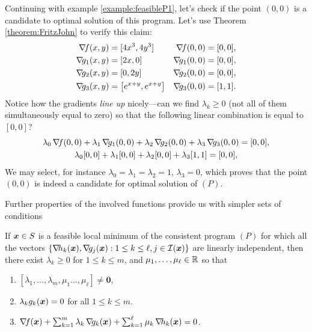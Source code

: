 \begin{example}
Continuing with example \ref{example:feasibleP1}, let's check if the point $(0,0)$ is a candidate to optimal solution of this program.  Let's use Theorem \ref{theorem:FritzJohn} to verify this claim:
\begin{align*}
\gradient{f}(x,y) &= [ 4x^3, 4y^3 ] &\gradient{f}(0,0) &= [0,0], \\
\gradient{g_1}(x,y) &= [ 2x, 0 ] &\gradient{g_1}(0,0) &= [0,0], \\
\gradient{g_2}(x,y) &= [0, 2y] &\gradient{g_2}(0,0) &= [0,0], \\
\gradient{g_3}(x,y) &= \big[e^{x+y}, e^{x+y} \big] &\gradient{g_3}(0,0) &= [1,1].
\end{align*}
Notice how the gradients \emph{line up} nicely---can we find $\lambda_k \geq 0$ (not all of them simultaneously equal to zero) so that the following linear combination is equal to $[0,0]$?
\begin{gather*}
\lambda_0\mathop{\nabla\! {f}}(0,0) + \lambda_1 \mathop{\nabla\! {g_1}}(0,0) + \lambda_2 \mathop{\nabla\! {g_2}}(0,0) + \lambda_3 \mathop{\nabla\! {g_3}}(0,0) = [0,0], \\
\lambda_0[0,0] + \lambda_1[0,0] + \lambda_2[0,0] + \lambda_3[1,1] = [0,0],
\end{gather*}
We may select, for instance $\lambda_0=\lambda_1=\lambda_2=1$, $\lambda_3=0$, which proves that the point $(0,0)$ is indeed a candidate for optimal solution of $(P)$.
\end{example}

\separator
Further properties of the involved functions provide us with simpler sets of conditions

\begin{theorem}\label{theorem:KKTnecessary}
If $\boldsymbol{x} \in S$ is a feasible local minimum of the consistent program $(P)$ for which all the vectors $\{ \mathop{\nabla\! {h_k}}(\boldsymbol{x}), \mathop{\nabla\! {g_j}}(\boldsymbol{x}) : 1 \leq k \leq \ell, j \in \mathcal{I}(\boldsymbol{x}) \}$ are linearly independent, then there exist $\lambda_k \geq 0$ for $1\leq k \leq m$, and $\mu_1, \dots, \mu_\ell \in \mathbb{R}$ so that
\begin{enumerate}
 	\item\label{item:KKTnecessary1} $[\lambda_1, \dotsc, \lambda_m, \mu_1 \dotsc, \mu_\ell ] \neq \boldsymbol{0}$,
 	\item\label{item:KKTnecessary2} $\lambda_k g_k(\boldsymbol{x}) = 0$ for all $1 \leq k \leq m$.
 	\item\label{item:KKTnecessary3} $\mathop{\nabla\! {f}}(\boldsymbol{x}) + \sum_{k=1}^m \lambda_k \mathop{\nabla\! {g_k}}(\boldsymbol{x}) + \sum_{k=1}^\ell \mu_k \mathop{\nabla\! {h_k}}(\boldsymbol{x}) = 0$.
 \end{enumerate}
\end{theorem}

